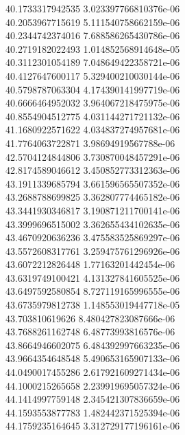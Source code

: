 {40.1733317942535 3.023397766810376e-06 \\
40.2053967715619 5.111540758662159e-06 \\
40.2344742374016 7.688586265430786e-06 \\
40.2719182022493 1.014852568914648e-05 \\
40.3112301054189 7.048649422358721e-06 \\
40.4127647600117 5.329400210030144e-06 \\
40.5798787063304 4.174390141997719e-06 \\
40.6666464952032 3.964067218475975e-06 \\
40.8554904512775 4.031144271721132e-06 \\
41.1680922571622 4.034837274957681e-06 \\
41.7764063722871 3.98694919567788e-06 \\
42.5704124844806 3.730870048457291e-06 \\
42.8174589046612 3.450852773312363e-06 \\
43.1911339685794 3.661596565507352e-06 \\
43.2688788699825 3.362807774465182e-06 \\
43.3441930346817 3.190871211700141e-06 \\
43.3999696515002 3.362655434102635e-06 \\
43.4670920636236 3.475583525869297e-06 \\
43.5572608317761 3.259475761296926e-06 \\
43.6072212826448 1.77163201442454e-06 \\
43.6319749100421 4.131327841605525e-06 \\
43.6497592580854 8.727119165996555e-06 \\
43.6735979812738 1.148553019447718e-05 \\
43.703810619626 8.480427823087666e-06 \\
43.7688261162748 6.48773993816576e-06 \\
43.8664946602075 6.484392997663235e-06 \\
43.9664354648548 5.490653165907133e-06 \\
44.0490017455286 2.617921609271434e-06 \\
44.1000215265658 2.239919695057324e-06 \\
44.1414997759148 2.345421307836659e-06 \\
44.1593553877783 1.482442371525394e-06 \\
44.1759235164645 3.312729177196161e-06 \\
}
